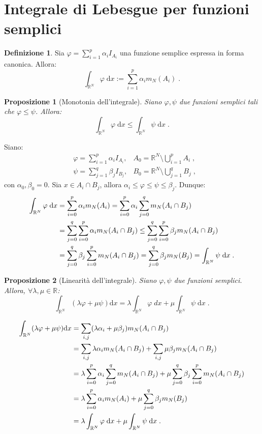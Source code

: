 \documentclass[a4paper,12pt]{report}
\theoremstyle{plain}
\newtheorem{prop}{Proposizione}[section]
\theoremstyle{definition}
\newtheorem{defn}{Definizione}[section]
\theoremstyle{remark}
\newcommand{\diff}[1]{\mathrm{d}#1}
\numberwithin{equation}{section}
\begin{document}
\section{Integrale di Lebesgue per funzioni semplici}
\begin{defn} Sia $\varphi=\sum_{i=1}^p \alpha_iI_{A_i}$ una funzione semplice espressa in forma canonica. Allora:
\begin{equation}
\int_{\mathbb{R}^N} \varphi\;\diff{x}:=\sum_{i=1}^p \alpha_i m_N(A_i)\;.
\end{equation}
\end{defn}
\begin{prop}[Monotonia dell'integrale] Siano $\varphi,\psi$ due funzioni semplici tali che $\varphi\le\psi$. Allora:
\begin{equation}
\int_{\mathbb{R}^N} \varphi\;\diff{x}\le \int_{\mathbb{R}^N} \psi\;\diff{x}\;.
\end{equation}
\end{prop}
\proof Siano:
\begin{align}
&\varphi=\sum_{i=1}^p\alpha_i I_{A_i}, & A_0=\mathbb{R}^N\setminus\bigcup_{i=1}^pA_i\;, \\
&\psi=\sum_{j=1}^q \beta_j I_{B_j}, & B_0=\mathbb{R}^N\setminus\bigcup_{j=1}^q B_j\;,
\end{align}
con $\alpha_0,\beta_0=0$. Sia $x \in A_i\cap B_j$, allora $\alpha_i\le\varphi\le\psi\le \beta_j$. Dunque:
\begin{align}
\int_{\mathbb{R}^N}\varphi\;\diff{x} &=\sum_{i=0}^p\alpha_i m_N(A_i)=\sum_{i=0}^p\alpha_i\sum_{j=0}^q m_N(A_i\cap B_j) \notag \\
&=\sum_{j=0}^q\sum_{i=0}^p\alpha_i m_N(A_i\cap B_j)\le \sum_{j=0}^q\sum_{i=0}^p\beta_jm_N(A_i\cap B_j) \notag \\
&=\sum_{j=0}^q\beta_j\sum_{i=0}^p m_N(A_i\cap B_j)=\sum_{j=0}^q\beta_jm_N(B_j)=\int_{\mathbb{R}^N}\psi\;\diff{x}\;.
\end{align}
\endproof
\begin{prop}[Linearità dell'integrale] Siano $\varphi,\psi$ due funzioni semplici. Allora, $\forall \lambda,\mu\in\mathbb{R}$:
\begin{equation}
\int_{\mathbb{R}^N}(\lambda\varphi+\mu\psi)\diff{x}=\lambda\int_{\mathbb{R}^N}\varphi\;dx+\mu\int_{\mathbb{R}^N}\psi\;\diff{x}\;.
\end{equation}
\end{prop}
\proof 
\begin{align}
\int_{\mathbb{R}^N}(\lambda\varphi+\mu\psi)\diff{x} &=\sum_{i,j}(\lambda\alpha_i+\mu\beta_j)m_N(A_i\cap B_j) \notag \\
&=\sum_{i,j}\lambda\alpha_im_N(A_i\cap B_j)+\sum_{i,j}\mu\beta_j m_N(A_i\cap B_j) \notag \\
&=\lambda\sum_{i=0}^p\alpha_i\sum_{j=0}^q m_N(A_i\cap B_j)+\mu\sum_{j=0}^q\beta_j\sum_{i=0}^p m_N(A_i\cap B_j) \notag \\
&=\lambda\sum_{i=0}^p\alpha_i m_N(A_i)+\mu\sum_{j=0}^q\beta_j m_N(B_j) \notag \\
&=\lambda\int_{\mathbb{R}^N}\varphi\;\diff{x}+\mu\int_{\mathbb{R}^N}\psi\;\diff{x}\;.
\end{align}
\endproof
\end{document}
